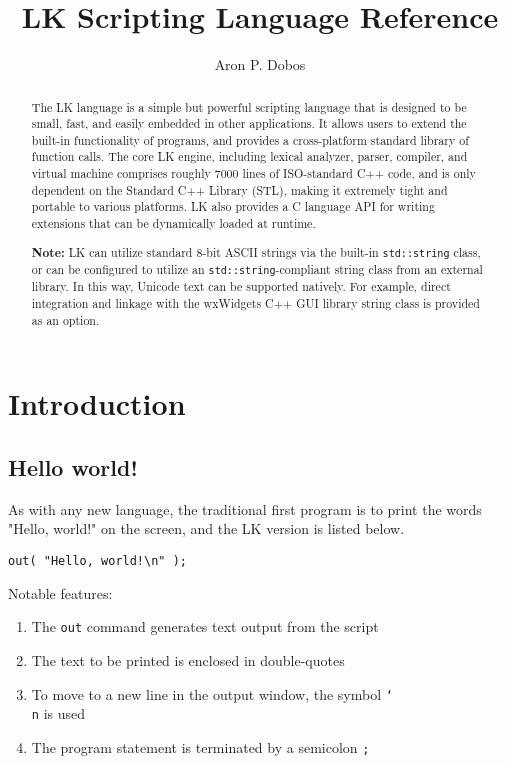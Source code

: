 \documentclass{article}
\title{LK Scripting Language Reference}
\author{Aron P. Dobos}
\newcommand\bslash{\char`\\}
\begin{document}
\maketitle
\vspace{3in}
\begin{abstract}
The LK language is a simple but powerful scripting language that is designed to be small, fast, and easily embedded in other applications.  It allows users to extend the built-in functionality of programs, and provides a cross-platform standard library of function calls.  The core LK engine, including lexical analyzer, parser, compiler, and virtual machine comprises roughly 7000 lines of ISO-standard C++ code, and is only dependent on the Standard C++ Library (STL), making it extremely tight and portable to various platforms.  LK also provides a C language API for writing extensions that can be dynamically loaded at runtime.

\textbf{Note:} LK can utilize standard 8-bit ASCII strings via the built-in \texttt{std::string} class, or can be configured to utilize an \texttt{std::string}-compliant string class from an external library.  In this way, Unicode text can be supported natively.  For example, direct integration and linkage with the wxWidgets C++ GUI library string class is provided as an option.
\end{abstract} 

\newpage
\tableofcontents
\newpage
\section{Introduction}
\subsection{Hello world!}

As with any new language, the traditional first program is to print the words "Hello, world!" on the screen, and the LK version is listed below.

\begin{verbatim}
out( "Hello, world!\n" );
\end{verbatim}

Notable features:
\begin{enumerate}
\item The \texttt{out} command generates text output from the script
\item The text to be printed is enclosed in double-quotes
\item To move to a new line in the output window, the symbol \texttt{\bslash n} is used
\item The program statement is terminated by a semicolon \texttt{;}
\end{enumerate}
\end{document}
